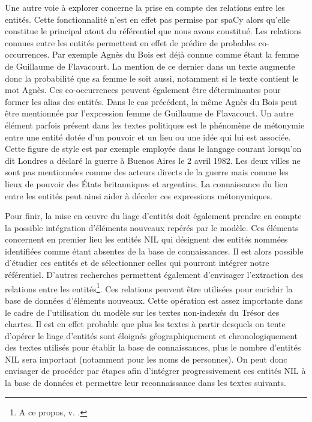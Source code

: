 \documentclass[a4paper,12pt,twoside]{book}
\begin{document}
	Une autre voie à explorer concerne la prise en compte des relations entre les entités. Cette fonctionnalité n'est en effet pas permise par spaCy alors qu'elle constitue le principal atout du référentiel que nous avons constitué. Les relations connues entre les entités permettent en effet de prédire de probables co-occurrences. Par exemple Agnès du Bois est déjà connue comme étant la femme de Guillaume de Flavacourt. La mention de ce dernier dans un texte augmente donc la probabilité que sa femme le soit aussi, notamment si le texte contient le mot \og Agnès\fg{}. Ces co-occurrences peuvent également être déterminantes pour former les alias des entités. Dans le cas précédent, la même Agnès du Bois peut être mentionnée par l'expression \og femme de Guillaume de Flavacourt\fg{}. Un autre élément parfois présent dans les textes politiques est le phénomène de métonymie entre une entité dotée d'un pouvoir et un lieu ou une idée qui lui est associée. Cette figure de style est par exemple employée dans le langage courant lorsqu'on dit \og Londres a déclaré la guerre à Buenos Aires le 2 avril 1982\fg{}. Les deux villes ne sont pas mentionnées comme des acteurs directs de la guerre mais comme les lieux de pouvoir des États britanniques et argentins. La connaissance du lien entre les entités peut ainsi aider à déceler ces expressions métonymiques. 
	
	Pour finir, la mise en œuvre du liage d'entités doit également prendre en compte la possible intégration d'éléments nouveaux repérés par le modèle. Ces éléments concernent en premier lieu les entités NIL qui désignent des entités nommées identifiées comme étant absentes de la base de connaissances. Il est alors possible d'étudier ces entités et de sélectionner celles qui pourront intégrer notre référentiel. D'autres recherches permettent également d'envisager l'extraction des relations entre les entités\footnote{A ce propos, v. \cite[p. 169--180]{dupont_structuration_2017}.}. Ces relations peuvent être utilisées pour enrichir la base de données d'éléments nouveaux. Cette opération est assez importante dans le cadre de l'utilisation du modèle sur les textes non-indexés du Trésor des chartes. Il est en effet probable que plus les textes à partir desquels on tente d'opérer le liage d'entités sont éloignés géographiquement et chronologiquement des textes utilisés pour établir la base de connaissances, plus le nombre d'entités NIL sera important (notamment pour les noms de personnes). On peut donc envisager de procéder par étapes afin d'intégrer progressivement ces entités NIL à la base de données et permettre leur reconnaissance dans les textes suivants.
	
\end{document}
